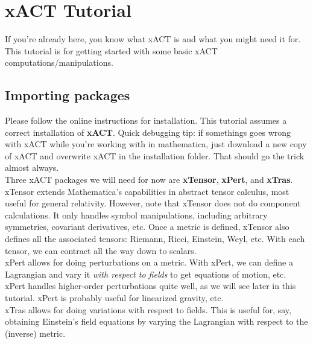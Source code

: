 \documentclass{book}
\theoremstyle{definition}
\begin{document}
\newpage


\section{xACT Tutorial}

If you're already here, you know what xACT is and what you might need it for. This tutorial is for getting started with some basic xACT computations/manipulations.



\subsection{Importing packages}

Please follow the online instructions for installation. This tutorial assumes a correct installation of \textbf{xACT}. Quick debugging tip: if somethings goes wrong with xACT while you're working with in mathematica, just download a new copy of xACT and overwrite xACT in the installation folder. That should go the trick almost always.\\

Three xACT packages we will need for now are \textbf{xTensor}, \textbf{xPert}, and \textbf{xTras}. xTensor extends Mathematica's capabilities in abstract tensor calculus, most useful for general relativity. However, note that xTensor does not do component calculations. It only handles symbol manipulations, including arbitrary symmetries, covariant derivatives, etc. Once a metric is defined, xTensor also defines all the associated tensors: Riemann, Ricci, Einstein, Weyl, etc. With each tensor, we can contract all the way down to scalars. \\

xPert allows for doing perturbations on a metric. With xPert, we can define a Lagrangian and vary it \textit{with respect to fields} to get equations of motion, etc. xPert handles higher-order perturbations quite well, as we will see later in this tutorial. xPert is probably useful for linearized gravity, etc.\\

xTras allows for doing variations with respect to fields. This is useful for, say, obtaining Einstein's field equations by varying the Lagrangian with respect to the (inverse) metric. \\
\end{document}
